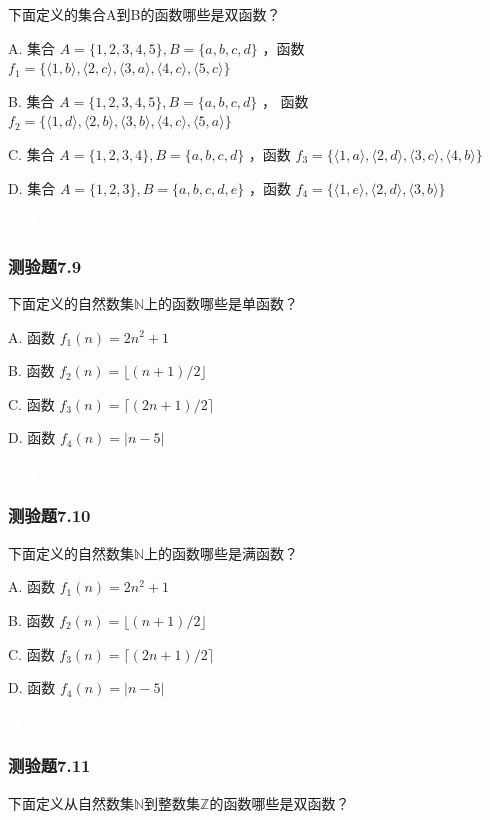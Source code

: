 \documentclass[UTF8, heading=true]{ctexart}
\begin{document}
下面定义的集合A到B的函数哪些是双函数？

A. 集合 $A=\{1,2,3,4,5\}, B=\{a, b, c, d\}$ ，函数 $f_1=\{\langle 1, b\rangle,\langle 2, c\rangle,\langle 3, a\rangle,\langle 4, c\rangle,\langle 5, c\rangle\}$ 

B. 集合 $A=\{1,2,3,4,5\}, B=\{a, b, c, d\}$ ，
函数 $f_2=\{\langle 1, d\rangle,\langle 2, b\rangle,\langle 3, b\rangle,\langle 4, c\rangle,\langle 5, a\rangle\}$ 

C. 集合 $A=\{1,2,3,4\}, B=\{a, b, c, d\}$ ，函数 $f_3=\{\langle 1, a\rangle,\langle 2, d\rangle,\langle 3, c\rangle,\langle 4, b\rangle\}$ 

D.  集合 $A=\{1,2,3\}, B=\{a, b, c, d, e\}$ ，函数 $f_4=\{\langle 1, e\rangle,\langle 2, d\rangle,\langle 3, b\rangle\}$


\textcolor{white}{答案：C}

\subsubsection{测验题7.9}

下面定义的自然数集$\mathbb{N}$上的函数哪些是单函数？

A. 函数 $f_1(n)=2 n^2+1$

B. 函数 $f_2(n)=\lfloor(n+1) / 2\rfloor$

C. 函数 $f_3(n)=\lceil(2 n+1) / 2\rceil$

D.  函数 $f_4(n)=|n-5|$

\textcolor{white}{答案：AC}

\subsubsection{测验题7.10}

下面定义的自然数集$\mathbb{N}$上的函数哪些是满函数？

A. 函数 $f_1(n)=2 n^2+1$

B. 函数 $f_2(n)=\lfloor(n+1) / 2\rfloor$

C. 函数 $f_3(n)=\lceil(2 n+1) / 2\rceil$

D.  函数 $f_4(n)=|n-5|$

\textcolor{white}{答案：BD}

\subsubsection{测验题7.11}

下面定义从自然数集$\mathbb{N}$到整数集$\mathbb{Z}$的函数哪些是双函数？
\end{document}
